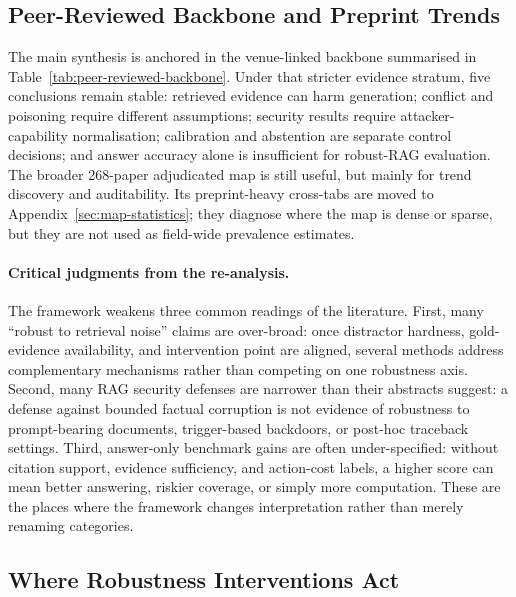 
\label{sec:crosscutting}








\subsection{Peer-Reviewed Backbone and Preprint Trends}

The main synthesis is anchored in the venue-linked backbone summarised in Table~\ref{tab:peer-reviewed-backbone}. Under that stricter evidence stratum, five conclusions remain stable: retrieved evidence can harm generation; conflict and poisoning require different assumptions; security results require attacker-capability normalisation; calibration and abstention are separate control decisions; and answer accuracy alone is insufficient for robust-RAG evaluation. The broader 268-paper adjudicated map is still useful, but mainly for trend discovery and auditability. Its preprint-heavy cross-tabs are moved to Appendix~\ref{sec:map-statistics}; they diagnose where the map is dense or sparse, but they are not used as field-wide prevalence estimates.

\paragraph{Critical judgments from the re-analysis.}
The framework weakens three common readings of the literature. First, many ``robust to retrieval noise'' claims are over-broad: once distractor hardness, gold-evidence availability, and intervention point are aligned, several methods address complementary mechanisms rather than competing on one robustness axis. Second, many RAG security defenses are narrower than their abstracts suggest: a defense against bounded factual corruption is not evidence of robustness to prompt-bearing documents, trigger-based backdoors, or post-hoc traceback settings. Third, answer-only benchmark gains are often under-specified: without citation support, evidence sufficiency, and action-cost labels, a higher score can mean better answering, riskier coverage, or simply more computation. These are the places where the framework changes interpretation rather than merely renaming categories.

\subsection{Where Robustness Interventions Act}

